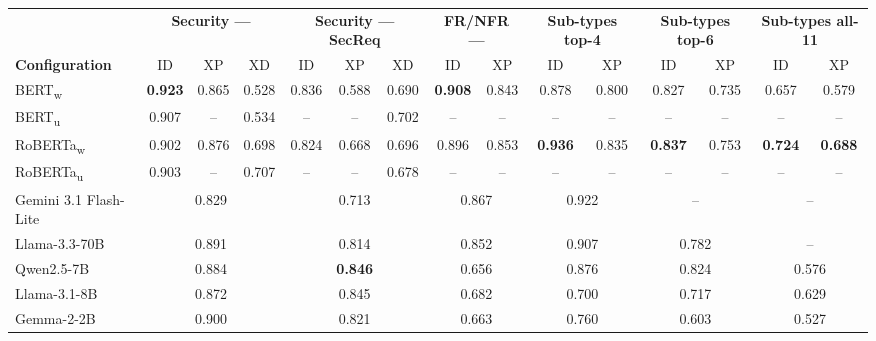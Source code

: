 \setlength{\tabcolsep}{3.0pt}
\renewcommand{\arraystretch}{1.02}
\scriptsize
\begin{tabular}{@{}l*{14}{c}@{}}
\toprule
& \multicolumn{3}{c}{\textbf{Security --- \pex{}}}
& \multicolumn{3}{c}{\textbf{Security --- SecReq}}
& \multicolumn{2}{c}{\textbf{FR/NFR --- \pex{}}}
& \multicolumn{2}{c}{\textbf{Sub-types top-4}}
& \multicolumn{2}{c}{\textbf{Sub-types top-6}}
& \multicolumn{2}{c}{\textbf{Sub-types all-11}} \\
\cmidrule(lr){2-4}\cmidrule(lr){5-7}\cmidrule(lr){8-9}%
\cmidrule(lr){10-11}\cmidrule(lr){12-13}\cmidrule(l){14-15}
\textbf{Configuration}
& ID & XP & XD & ID & XP & XD & ID & XP & ID & XP & ID & XP & ID & XP \\
\midrule
BERT\textsubscript{w} & \bfseries 0.923 & 0.865 & 0.528 & 0.836 & 0.588 & 0.690 & \bfseries 0.908 & 0.843 & 0.878 & 0.800 & 0.827 & 0.735 & 0.657 & 0.579 \\
BERT\textsubscript{u} & 0.907 & -- & 0.534 & -- & -- & 0.702 & -- & -- & -- & -- & -- & -- & -- & -- \\
RoBERTa\textsubscript{w} & 0.902 & 0.876 & 0.698 & 0.824 & 0.668 & 0.696 & 0.896 & 0.853 & \bfseries 0.936 & 0.835 & \bfseries 0.837 & 0.753 & \bfseries 0.724 & \bfseries 0.688 \\
RoBERTa\textsubscript{u} & 0.903 & -- & 0.707 & -- & -- & 0.678 & -- & -- & -- & -- & -- & -- & -- & -- \\
\addlinespace[2pt]
Gemini 3.1 Flash-Lite & \multicolumn{3}{c}{0.829} & \multicolumn{3}{c}{0.713} & \multicolumn{2}{c}{0.867} & \multicolumn{2}{c}{0.922} & \multicolumn{2}{c}{--} & \multicolumn{2}{c}{--} \\
Llama-3.3-70B & \multicolumn{3}{c}{0.891} & \multicolumn{3}{c}{0.814} & \multicolumn{2}{c}{0.852} & \multicolumn{2}{c}{0.907} & \multicolumn{2}{c}{0.782} & \multicolumn{2}{c}{--} \\
Qwen2.5-7B & \multicolumn{3}{c}{0.884} & \multicolumn{3}{c}{\bfseries 0.846} & \multicolumn{2}{c}{0.656} & \multicolumn{2}{c}{0.876} & \multicolumn{2}{c}{0.824} & \multicolumn{2}{c}{0.576} \\
Llama-3.1-8B & \multicolumn{3}{c}{0.872} & \multicolumn{3}{c}{0.845} & \multicolumn{2}{c}{0.682} & \multicolumn{2}{c}{0.700} & \multicolumn{2}{c}{0.717} & \multicolumn{2}{c}{0.629} \\
Gemma-2-2B & \multicolumn{3}{c}{0.900} & \multicolumn{3}{c}{0.821} & \multicolumn{2}{c}{0.663} & \multicolumn{2}{c}{0.760} & \multicolumn{2}{c}{0.603} & \multicolumn{2}{c}{0.527} \\

\end{tabular}
